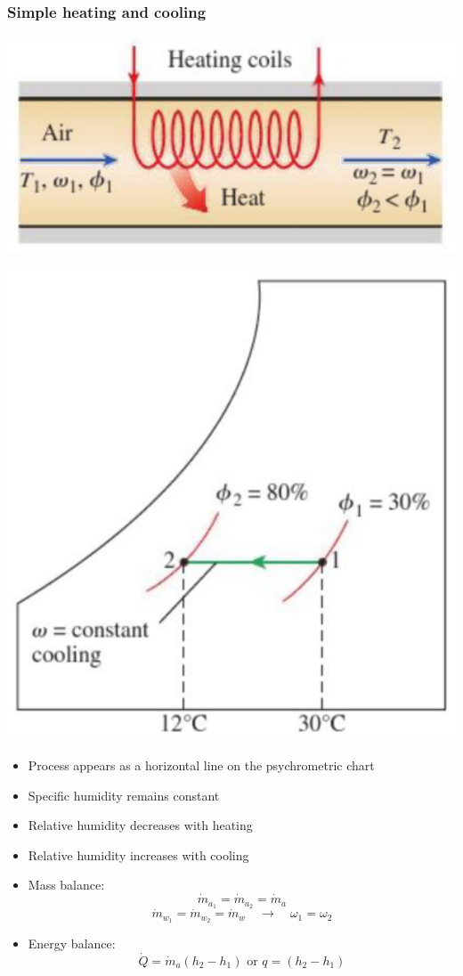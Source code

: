 \documentclass[11pt]{article}
\begin{document}
\subsubsection{Simple heating and cooling}
\label{sec:org1d2c812}
\begin{center}
\includegraphics[scale=0.6]{./images/simple-heating-and-cooling-diagram.png}
\end{center}

\begin{center}
\includegraphics[scale=0.7]{./images/simple-heating-and-cooling-psychrometric-chart.png}
\end{center}
\begin{itemize}
\item Process appears as a horizontal line on the psychrometric chart
\item Specific humidity remains constant
\item Relative humidity decreases with heating
\item Relative humidity increases with cooling
\item Mass balance:
\[\dot{m}_{a_1} = \dot{m}_{a_2} = \dot{m}_a\]
\[\dot{m}_{w_1} = \dot{m}_{w_2} = \dot{m}_w \quad \rightarrow \quad \omega_1 = \omega_2\]
\item Energy balance:
\[\dot{Q} = \dot{m}_a (h_2 - h_1) \text{ or } q = (h_2 - h_1)\]
\end{itemize}
\end{document}
